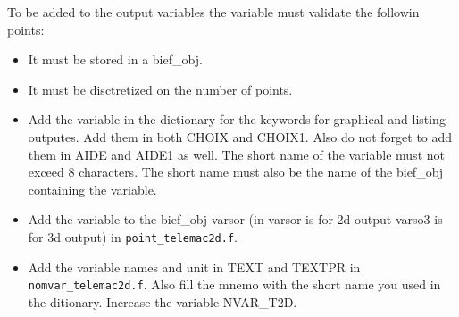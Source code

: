 To be added to the output variables the variable must validate the followin points:
\begin{itemize}
  \item It must be stored in a bief\_obj.
  \item It must be disctretized on the number of points.
\end{itemize}

\begin{itemize}
  \item Add the variable in the dictionary for the keywords for graphical and
    listing outputes. Add them in both CHOIX and CHOIX1. Also do not forget to
    add them in AIDE and AIDE1 as well. The short name of the variable must not
    exceed 8 characters. The short name must also be the name of the bief\_obj
    containing the variable.
  \item Add the variable to the bief\_obj varsor (in  varsor is for 2d output
    varso3 is for 3d output) in \verb!point_telemac2d.f!.
  \item Add the variable names and unit in TEXT and TEXTPR in
    \verb!nomvar_telemac2d.f!. Also fill the mnemo with the short name you used
    in the ditionary. Increase the variable NVAR\_T2D.
\end{itemize}
